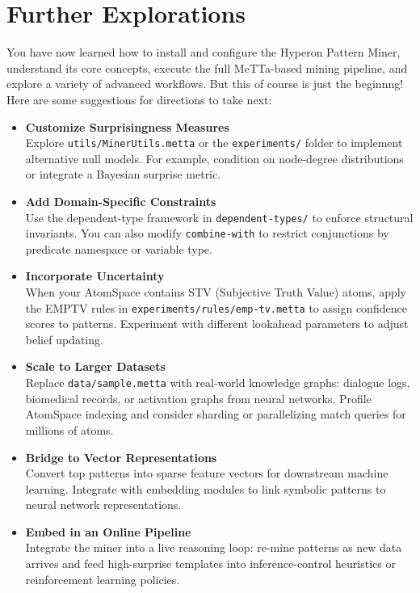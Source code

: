 
\section{Further Explorations}

You have now learned how to install and configure the Hyperon Pattern Miner, understand its core concepts, execute the full MeTTa-based mining pipeline, and explore a variety of advanced workflows.  But this of course is just the beginnng! Here are some suggestions for directions to take next:

\begin{itemize}
  \item \textbf{Customize Surprisingness Measures}\\
    Explore \texttt{utils/MinerUtils.metta} or the \texttt{experiments/} folder to implement alternative null models.  For example, condition on node-degree distributions or integrate a Bayesian surprise metric.

  \item \textbf{Add Domain-Specific Constraints}\\
    Use the dependent-type framework in \texttt{dependent-types/} to enforce structural invariants.  You can also modify \texttt{combine-with} to restrict conjunctions by predicate namespace or variable type.

  \item \textbf{Incorporate Uncertainty}\\
    When your AtomSpace contains STV (Subjective Truth Value) atoms, apply the EMPTV rules in \texttt{experiments/rules/emp-tv.metta} to assign confidence scores to patterns.  Experiment with different lookahead parameters to adjust belief updating.

  \item \textbf{Scale to Larger Datasets}\\
    Replace \texttt{data/sample.metta} with real-world knowledge graphs: dialogue logs, biomedical records, or activation graphs from neural networks.  Profile AtomSpace indexing and consider sharding or parallelizing match queries for millions of atoms.

  \item \textbf{Bridge to Vector Representations}\\
    Convert top patterns into sparse feature vectors for downstream machine learning.  Integrate with embedding modules to link symbolic patterns to neural network representations.

  \item \textbf{Embed in an Online Pipeline}\\
    Integrate the miner into a live reasoning loop: re-mine patterns as new data arrives and feed high-surprise templates into inference-control heuristics or reinforcement learning policies.


\end{itemize}
